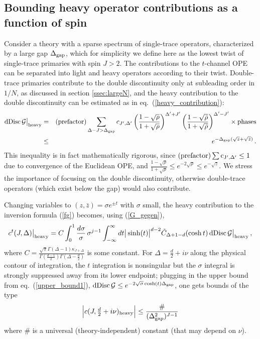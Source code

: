 \documentclass[11pt, reqno,preprint]{article}
\def\be{\begin{equation}}
\def\ee{\end{equation}}
\def\ba{\begin{eqnarray}}
\def\ea{\end{eqnarray}}
\def\dDisc{{\rm dDisc}\,}
\def\rhobar{\bar{\rho}}
\def\zbar{\bar{z}}
\def\j{J}
\def\GG{\mathcal{G}}
\begin{document}
\subsection{Bounding heavy operator contributions as a function of spin}

Consider a theory with a sparse spectrum of single-trace operators, characterized by a large gap $\Delta_{\rm gap}$,
which for simplicity we define here as the lowest twist of single-trace primaries with spin $\j>2$.
The contributions to the $t$-channel OPE can be separated into light and heavy operators according to their twist.
Double-trace primaries contribute to the double discontinuity only at subleading order in $1/N$,
as discussed in section \ref{ssec:largeN},
and the heavy contribution to the double discontinuity can be estimated as in eq.~(\ref{heavy_contribution}):
\ba
 \dDisc \GG\big|_{\rm heavy} &=&
 \mbox{(prefactor)}\sum_{\Delta-\j> \Delta_{\rm gap}} c_{\j',\Delta'}
 \left(\frac{1-\sqrt{\rho}}{1+\sqrt{\rho}}\right)^{\Delta' +\j'}
 \left(\frac{1-\sqrt{\rhobar}}{1+\sqrt{\rhobar}}\right)^{\Delta' -\j'}\times \mbox{phases}
\nonumber\\
&\leq& e^{-\Delta_{\rm gap}(\sqrt{z}+\sqrt{\zbar})}\,. \label{upper_bound1}
\ea
This inequality is in fact mathematically rigorous, since
$(\rm prefactor)\sum c_{\j',\Delta'}\leq 1$ due to convergence of the Euclidean OPE,
and $\frac{1-\sqrt{\rho}}{1+\sqrt{\rho}}\leq e^{-2\sqrt{\rho}}\leq e^{-\sqrt{z}}$.
We stress the importance of focusing on the double discontinuity,
otherwise double-trace operators (which exist below the gap) would also contribute.

Changing variables to $(z,\zbar)=\sigma e^{\pm t}$ with $\sigma$ small,
the heavy contribution to the inversion formula (\ref{fg}) becomes, using (\ref{G_gegen}),
\be
 c^t(\j,\Delta)\big|_{\rm heavy} = C
 \int_0^1 \frac{d\sigma}{\sigma}\,\sigma^{j-1}
\int_{-\infty}^\infty dt \big|\sinh(t)\big|^{d-2} \tilde{C}_{\Delta+1-d}(\cosh t) \,\dDisc \GG\big|_{\rm heavy}\,, \label{inv_heavy}
\ee
where $C=\frac{\sqrt{\pi}\Gamma(\Delta-1)\kappa_{\j+\Delta}}{\Gamma(\frac{d-1}{2})\Gamma(\Delta-\frac{d}{2})}$
is some constant.
For $\Delta=\frac{d}{2}+i\nu$ along the physical contour of integration,
the $t$ integration is nonsingular but the $\sigma$ integral is strongly suppressed away from its lower endpoint;
plugging in the upper bound  from eq.~(\ref{upper_bound1}), $\dDisc \GG\leq e^{-2\sqrt{\sigma}\cosh(t)\Delta_{\rm gap}}$,
one gets bounds of the type
\be
 \Big|c(\j,\tfrac{d}{2}+i\nu)_{\rm heavy}\Big| \leq \frac{\#}{(\Delta_{\rm gap}^2)^{\j-1}} \label{bound}
\ee
where $\#$ is a universal (theory-independent) constant (that may depend on $\nu$).
\end{document}
